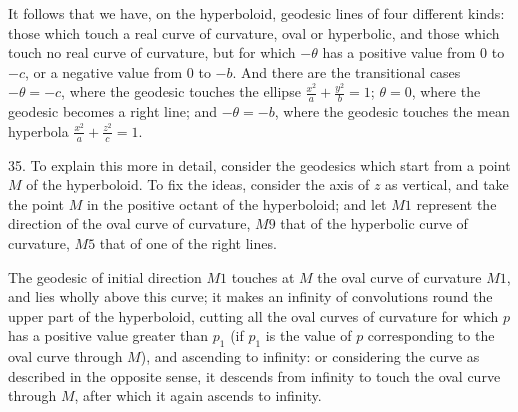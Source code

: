 \documentclass[11pt,a4paper]{article}
\begin{document}
\begin{center}
\end{center}

It follows that we have, on the hyperboloid, geodesic lines of four different kinds:
those which touch a real curve of curvature, oval or hyperbolic, and those which touch no
real curve of curvature, but for which $-\theta$ has a positive value from $0$ to $-c$, or
a negative value from $0$ to $-b$. And there are the transitional cases $-\theta=-c$,
where the geodesic touches the ellipse $\frac{x^2}{a}+\frac{y^2}{b}=1$; $\theta=0$,
where the geodesic becomes a right line; and $-\theta=-b$, where the geodesic touches the
mean hyperbola $\frac{x^2}{a}+\frac{z^2}{c}=1$.

35. To explain this more in detail, consider the geodesics which start from a point $M$ of
the hyperboloid. To fix the ideas, consider the axis of $z$ as vertical, and take the point
$M$ in the positive octant of the hyperboloid; and let $M1$ represent the direction of the
oval curve of curvature, $M9$ that of the hyperbolic curve of curvature, $M5$ that of one
of the right lines.

The geodesic of initial direction $M1$ touches at $M$ the oval curve of curvature $M1$,
and lies wholly above this curve; it makes an infinity of convolutions round the upper part
of the hyperboloid, cutting all the oval curves of curvature for which $p$ has a positive
value greater than $p_1$ (if $p_1$ is the value of $p$ corresponding to the oval curve
through $M$), and ascending to infinity: or considering the curve as described in the opposite
sense, it descends from infinity to touch the oval curve through $M$, after which it again
ascends to infinity.

\begin{center}
\end{center}
\end{document}
